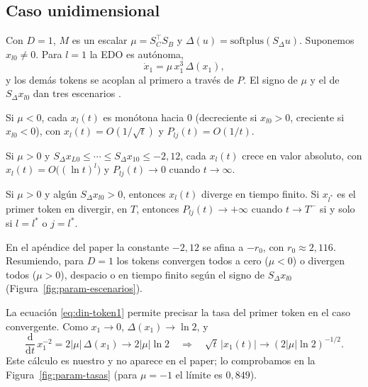 \subsection{Caso unidimensional}
\label{sec:din-1d}

Con $D=1$, $M$ es un escalar $\mu=S_C^{\top}S_B$ y $\Delta(u)=\mathrm{softplus}(S_\Delta u)$. Suponemos $x_{l0}\neq0$. Para $l=1$ la EDO es autónoma,
\begin{equation}
  \dot{x}_1=\mu\,x_1^{3}\,\Delta(x_1),
  \label{eq:din-token1}
\end{equation}
y los demás tokens se acoplan al primero a través de $P$. El signo de $\mu$ y el de $S_\Delta x_{l0}$ dan tres escenarios \cite{vo2025token}.

\begin{teorema}[Convergencia]\label{thm:din-conv}
  Si $\mu<0$, cada $x_l(t)$ es monótona hacia $0$ (decreciente si $x_{l0}>0$, creciente si $x_{l0}<0$), con $x_l(t)=O(1/\sqrt{t})$ y $P_{lj}(t)=O(1/t)$.
\end{teorema}

\begin{teorema}\label{thm:din-lenta}
  Si $\mu>0$ y $S_\Delta x_{L0}\le\cdots\le S_\Delta x_{10}\le -2{,}12$, cada $x_l(t)$ crece en valor absoluto, con $x_l(t)=O\big((\ln t)^{l}\big)$ y $P_{lj}(t)\to 0$ cuando $t\to\infty$.
\end{teorema}

\begin{teorema}\label{thm:din-rapida}
  Si $\mu>0$ y algún $S_\Delta x_{l0}>0$, entonces $x_l(t)$ diverge en tiempo finito. Si $x_{l^*}$ es el primer token en divergir, en $T$, entonces $P_{lj}(t)\to+\infty$ cuando $t\to T^-$ si y solo si $l=l^*$ o $j=l^*$.
\end{teorema}

En el apéndice del paper la constante $-2{,}12$ se afina a $-r_0$, con $r_0\approx2{,}116$. Resumiendo, para $D=1$ los tokens convergen todos a cero ($\mu<0$) o divergen todos ($\mu>0$), despacio o en tiempo finito según el signo de $S_\Delta x_{l0}$ (Figura~\ref{fig:param-escenarios}).

La ecuación \eqref{eq:din-token1} permite precisar la tasa del primer token en el caso convergente. Como $x_1\to0$, $\Delta(x_1)\to\ln2$, y
\[
  \frac{\mathrm{d}}{\mathrm{d}t}\,x_1^{-2}=2|\mu|\,\Delta(x_1)\longrightarrow 2|\mu|\ln 2
  \quad\Longrightarrow\quad
  \sqrt{t}\,|x_1(t)|\to(2|\mu|\ln 2)^{-1/2}.
\]
Este cálculo es nuestro y no aparece en el paper; lo comprobamos en la Figura~\ref{fig:param-tasas} (para $\mu=-1$ el límite es $0{,}849$).

